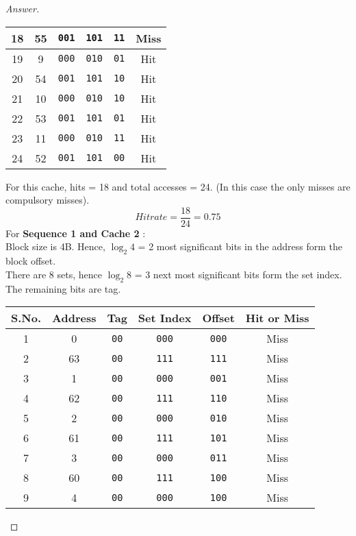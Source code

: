 \documentclass[12pt]{article}
\begin{document}
\begin{proof}[Answer]
\begin{center}
\begin{tabular}{||c | c |  c | c | c | c ||}
18 & 55 & \verb|001| & \verb|101| & \verb|11| & Miss \\ \hline
19 & 9 & \verb|000| & \verb|010| & \verb|01| & Hit \\ \hline
20 & 54 & \verb|001| & \verb|101| & \verb|10| & Hit \\ \hline
21 & 10 & \verb|000| & \verb|010| & \verb|10| & Hit \\ \hline
22 & 53 & \verb|001| & \verb|101| & \verb|01| & Hit \\ \hline
23 & 11 & \verb|000| & \verb|010| & \verb|11| & Hit \\ \hline
24 & 52 & \verb|001| & \verb|101| & \verb|00| & Hit \\ \hline
\end{tabular}
\end{center}
For this cache, hits = 18 and total accesses = 24. (In this case the only misses are compulsory misses). \\
\[ Hit rate = \frac{18}{24} = 0.75 \] 
For \textbf{Sequence 1  and Cache 2 }: \\ 
Block size is 4B. Hence, $\log_2 4$ = 2 most significant bits in the address form the block offset. \\
There are 8 sets, hence $\log_2 8$ = 3 next most significant bits form the set index. \\
The remaining bits are tag. 
\begin{center}
\begin{tabular}{||c | c |  c | c | c | c ||}
\hline
\textbf{S.No.} & \textbf{Address} &  \textbf{Tag} &\textbf{Set Index} & \textbf{Offset} & \textbf{Hit or Miss } \\  \hline
1 & 0 & \verb|00| & \verb|000| & \verb|000| & Miss \\ \hline
2 & 63 & \verb|00| & \verb|111| & \verb|111| & Miss \\ \hline
3 & 1 & \verb|00| & \verb|000| & \verb|001| & Miss \\ \hline 
4 & 62 & \verb|00| & \verb|111| & \verb|110| & Miss \\ \hline
5 & 2 & \verb|00| & \verb|000| & \verb|010| & Miss\\ \hline
6 & 61 & \verb|00| & \verb|111| & \verb|101| & Miss \\ \hline
7 & 3 & \verb|00| & \verb|000| & \verb|011| & Miss \\ \hline
8 & 60 & \verb|00| & \verb|111| & \verb|100| & Miss \\ \hline
9 & 4 & \verb|00| & \verb|000| & \verb|100| & Miss \\ \hline

\end{tabular}
\end{center}
\end{proof}
\end{document}
